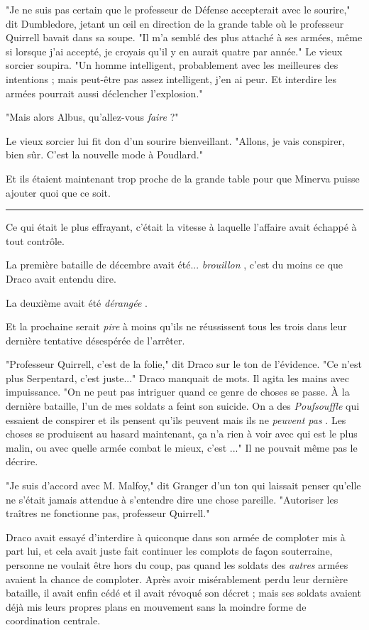 "Je ne suis pas certain que le professeur de Défense accepterait avec le sourire," dit Dumbledore, jetant un œil en direction de la grande table où le professeur Quirrell bavait dans sa soupe. "Il m'a semblé des plus attaché à ses armées, même si lorsque j'ai accepté, je croyais qu'il y en aurait quatre par année." Le vieux sorcier soupira. "Un homme intelligent, probablement avec les meilleures des intentions ; mais peut-être pas assez intelligent, j'en ai peur. Et interdire les armées pourrait aussi déclencher l'explosion."

"Mais alors Albus, qu'allez-vous \emph{faire}  ?"

Le vieux sorcier lui fit don d'un sourire bienveillant. "Allons, je vais conspirer, bien sûr. C'est la nouvelle mode à Poudlard."

Et ils étaient maintenant trop proche de la grande table pour que Minerva puisse ajouter quoi que ce soit.
\par\noindent\rule{\textwidth}{0.4pt}
Ce qui était le plus effrayant, c'était la vitesse à laquelle l'affaire avait échappé à tout contrôle.

La première bataille de décembre avait été... \emph{brouillon} , c'est du moins ce que Draco avait entendu dire.

La deuxième avait été \emph{dérangée} .

Et la prochaine serait \emph{pire}  à moins qu'ils ne réussissent tous les trois dans leur dernière tentative désespérée de l'arrêter.

"Professeur Quirrell, c'est de la folie," dit Draco sur le ton de l'évidence. "Ce n'est plus Serpentard, c'est juste..." Draco manquait de mots. Il agita les mains avec impuissance. "On ne peut pas intriguer quand ce genre de choses se passe. À la dernière bataille, l'un de mes soldats a feint son suicide. On a des \emph{Poufsouffle}  qui essaient de conspirer et ils pensent qu'ils peuvent mais ils ne \emph{peuvent pas} . Les choses se produisent au hasard maintenant, ça n'a rien à voir avec qui est le plus malin, ou avec quelle armée combat le mieux, c'est ..." Il ne pouvait même pas le décrire.

"Je suis d'accord avec M. Malfoy," dit Granger d'un ton qui laissait penser qu'elle ne s'était jamais attendue à s'entendre dire une chose pareille. "Autoriser les traîtres ne fonctionne pas, professeur Quirrell."

Draco avait essayé d'interdire à quiconque dans son armée de comploter mis à part lui, et cela avait juste fait continuer les complots de façon souterraine, personne ne voulait être hors du coup, pas quand les soldats des \emph{autres } armées avaient la chance de comploter. Après avoir misérablement perdu leur dernière bataille, il avait enfin cédé et il avait révoqué son décret ; mais ses soldats avaient déjà mis leurs propres plans en mouvement sans la moindre forme de coordination centrale.

